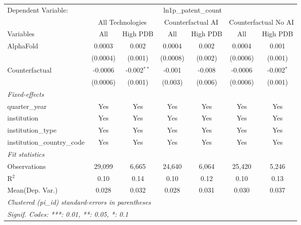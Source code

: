 \begingroup
\centering
\begin{tabular}{lcccccc}
   \tabularnewline \midrule \midrule
   Dependent Variable: & \multicolumn{6}{c}{ln1p\_patent\_count}\\
 & \multicolumn{2}{c}{All Technologies} & \multicolumn{2}{c}{Counterfactual AI} & \multicolumn{2}{c}{Counterfactual No AI} \\
\cmidrule(lr){1-1}\cmidrule(lr){2-3} \cmidrule(lr){4-5} \cmidrule(lr){6-7}
Variables & \multicolumn{1}{c}{All} & \multicolumn{1}{c}{High PDB} & \multicolumn{1}{c}{All} & \multicolumn{1}{c}{High PDB} & \multicolumn{1}{c}{All} & \multicolumn{1}{c}{High PDB} \\
\cmidrule(lr){1-1}\cmidrule(lr){2-2} \cmidrule(lr){3-3} \cmidrule(lr){4-4} \cmidrule(lr){5-5} \cmidrule(lr){6-6} \cmidrule(lr){7-7}
   AlphaFold                    & 0.0003   & 0.002         & 0.0004   & 0.002   & 0.0004   & 0.001\\   
                                & (0.0004) & (0.001)       & (0.0008) & (0.002) & (0.0006) & (0.001)\\   
   Counterfactual               & -0.0006  & -0.002$^{**}$ & -0.001   & -0.008  & -0.0006  & -0.002$^{*}$\\   
                                & (0.0006) & (0.001)       & (0.003)  & (0.006) & (0.0006) & (0.001)\\   
   \midrule
   \emph{Fixed-effects}\\
   quarter\_year                & Yes      & Yes           & Yes      & Yes     & Yes      & Yes\\  
   institution                  & Yes      & Yes           & Yes      & Yes     & Yes      & Yes\\  
   institution\_type            & Yes      & Yes           & Yes      & Yes     & Yes      & Yes\\  
   institution\_country\_code   & Yes      & Yes           & Yes      & Yes     & Yes      & Yes\\  
   \midrule
   \emph{Fit statistics}\\
   Observations                 & 29,099   & 6,665         & 24,640   & 6,064   & 25,420   & 5,246\\  
   R$^2$                        & 0.10     & 0.14          & 0.10     & 0.12    & 0.10     & 0.13\\  
Mean(Dep. Var.) & 0.028 & 0.032 & 0.028 & 0.031 & 0.030 & 0.037 \\
   \midrule \midrule
   \multicolumn{7}{l}{\emph{Clustered (pi\_id) standard-errors in parentheses}}\\
   \multicolumn{7}{l}{\emph{Signif. Codes: ***: 0.01, **: 0.05, *: 0.1}}\\
\end{tabular}
\par\endgroup
